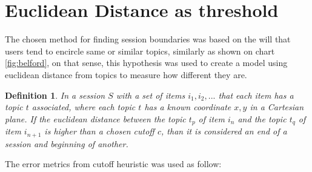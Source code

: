 \documentclass[ecp,tc,english]{iiufrgs}
\newtheorem{definition}{Definition}
\begin{document}
    \section{Euclidean Distance as threshold} \label{euclidean_distance_heuristic}
    The chosen method for finding session boundaries was based on the will that users tend to encircle same or similar topics, similarly as shown on chart \ref{fig:belford}, on that sense, this hypothesis was used to create a model using euclidean distance from topics to measure how different they are.
    
    \begin{definition}
    In a session \(S\) with a set of items \(i_{1}, i_{2}, ...\) that each item has a \textit{topic} \(t\) associated, where each \textit{topic} \(t\) has a known coordinate \(x, y\) in a Cartesian plane.
    If the euclidean distance between the topic \(t_{p}\) of item \(i_{n}\) and the topic \(t_{q}\) of item \(i_{n+1}\) is higher than a chosen cutoff \(c\), than it is considered an end of a session and beginning of another.
    \label{euclidean_distance_threshold_definition}
    \end{definition}

    
    The error metrics from cutoff heuristic was used as follow:
    
\end{document}
